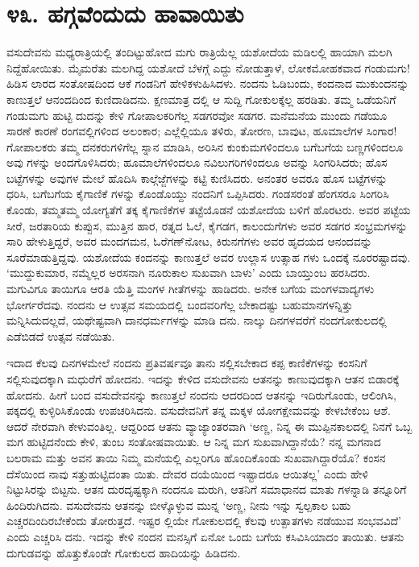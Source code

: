 
\chapter{೪೩. ಹಗ್ಗವೆಂದುದು ಹಾವಾಯಿತು}

ವಸುದೇವನು ಮಧ್ಯರಾತ್ರಿಯಲ್ಲಿ ತಂದಿಟ್ಟುಹೋದ ಮಗು ರಾತ್ರಿಯೆಲ್ಲ ಯಶೋದೆಯ ಮಡಿಲಲ್ಲಿ ಹಾಯಾಗಿ ಮಲಗಿ ನಿದ್ದೆಹೋಯಿತು. ಮೈಮರೆತು ಮಲಗಿದ್ದ ಯಶೋದೆ ಬೆಳಗ್ಗೆ ಎದ್ದು ನೋಡುತ್ತಾಳೆ, ಲೋಕಮೋಹಕವಾದ ಗಂಡುಮಗು! ಹಿಡಿಸ ಲಾರದ ಸಂತೋಷದಿಂದ ಆಕೆ ಗಂಡನಿಗೆ ಹೇಳಿಕಳುಹಿಸಿದಳು. ನಂದನು ಓಡಿಬಂದು, ಕಂದನಾದ ಮುಕುಂದನನ್ನು ಕಾಣುತ್ತಲೆ ಆನಂದದಿಂದ ಕುಣಿದಾಡಿದನು. ಕ್ಷಣಮಾತ್ರ ದಲ್ಲಿ ಆ ಸುದ್ದಿ ಗೋಕುಲಕ್ಕೆಲ್ಲ ಹರಡಿತು. ತಮ್ಮ ಒಡೆಯನಿಗೆ ಗಂಡುಮಗು ಹುಟ್ಟಿ ದುದನ್ನು ಕೇಳಿ ಗೋಪಾಲಕರಿಗೆಲ್ಲ ಸಡಗರವೋ ಸಡಗರ. ಮನೆಮನೆಯ ಮುಂದು ಗಡೆಯೂ ಸಾರಣೆ ಕಾರಣೆ ರಂಗವಲ್ಲಿಗಳಿಂದ ಅಲಂಕಾರ; ಎಲ್ಲೆಲ್ಲಿಯೂ ತಳಿರು, ತೋರಣ, ಬಾವುಟ, ಹೂಮಾಲೆಗಳ ಸಿಂಗಾರ! ಗೋಪಾಲಕರು ತಮ್ಮ ದನಕರುಗಳಿಗೆಲ್ಲ ಸ್ನಾನ ಮಾಡಿಸಿ, ಅರಿಸಿನ ಕುಂಕುಮಗಳಿಂದಲೂ ಬಗೆಬಗೆಯ ಬಣ್ಣಗಳಿಂದಲೂ ಅವು ಗಳನ್ನು ಅಂದಗೊಳಿಸಿದರು; ಹೂಮಾಲೆಗಳಿಂದಲೂ ನವಿಲುಗರಿಗಳಿಂದಲೂ ಅವನ್ನು ಸಿಂಗರಿಸಿದರು; ಹೊಸ ಬಟ್ಟೆಗಳನ್ನು ಅವುಗಳ ಮೇಲೆ ಹೊದಿಸಿ ಕಾಲ್ಗೆಜ್ಜೆಗಳನ್ನು ಕಟ್ಟಿ ಕುಣಿಸಿದರು. ಅನಂತರ ಅವರೂ ಹೊಸ ಬಟ್ಟೆಗಳನ್ನು ಧರಿಸಿ, ಬಗೆಬಗೆಯ ಕೈಗಾಣಿಕೆ ಗಳನ್ನು ಕೊಂಡೊಯ್ದು ನಂದನಿಗೆ ಒಪ್ಪಿಸಿದರು. ಗಂಡಸರಂತೆ ಹೆಂಗಸರೂ ಸಿಂಗರಿಸಿ ಕೊಂಡು, ತಮ್ಮತಮ್ಮ ಯೋಗ್ಯತೆಗೆ ತಕ್ಕ ಕೈಗಾಣಿಕೆಗಳ ತಟ್ಟೆಯೊಡನೆ ಯಶೋದೆಯ ಬಳಿಗೆ ಹೊರಟರು. ಅವರ ಪಟ್ಟೆಯ ಸೀರೆ, ಜರತಾರಿಯ ಕುಪ್ಪುಸ, ಮುತ್ತಿನ ಹಾರ, ರತ್ನದ ಓಲೆ, ಕೈಗಡಗ, ಕಾಲಂದುಗೆಗಳು ಅವರ ಸಡಗರ ಸಂಭ್ರಮಗಳನ್ನು ಸಾರಿ ಹೇಳುತ್ತಿದ್ದರೆ, ಅವರ ಮಂದಗಮನ, ಓರೆಗಣ್​ನೋಟ, ಕಿರುನಗೆಗಳು ಅವರ ಹೃದಯದ ಆನಂದವನ್ನು ಸೂರೆಮಾಡುತ್ತಿದ್ದವು. ಯಶೋದೆಯ ಕಂದನನ್ನು ಕಾಣುತ್ತಲೆ ಅವರ ಉಲ್ಲಾಸ ಉತ್ಸಾಹ ಗಳು ಒಂದಕ್ಕೆ ನೂರರಷ್ಟಾದವು. ‘ಮುದ್ದುಕುಮಾರ, ನಮ್ಮೆಲ್ಲರ ಅರಸನಾಗಿ ನೂರುಕಾಲ ಸುಖವಾಗಿ ಬಾಳು’ ಎಂದು ಬಾಯ್ತುಂಬ ಹರಸಿದರು. ಮಗುವಿಗೂ ತಾಯಿಗೂ ಆರತಿ ಯೆತ್ತಿ ಮಂಗಳ ಗೀತೆಗಳನ್ನು ಹಾಡಿದರು. ಅನೇಕ ಬಗೆಯ ಮಂಗಳವಾದ್ಯಗಳು ಭೋರ್ಗರೆದವು. ನಂದನು ಆ ಉತ್ಸವ ಸಮಯದಲ್ಲಿ ಬಂದವರಿಗೆಲ್ಲ ಬೇಕಾದಷ್ಟು ಬಹುಮಾನಗಳನ್ನಿತ್ತು ಮನ್ನಿಸಿದುದಲ್ಲದೆ, ಯಥೇಷ್ಟವಾಗಿ ದಾನಧರ್ಮಗಳನ್ನು ಮಾಡಿ ದನು. ನಾಲ್ಕು ದಿನಗಳವರೆಗೆ ನಂದಗೋಕುಲದಲ್ಲಿ ಎಡೆಬಿಡದೆ ಉತ್ಸವ ನಡೆಯಿತು.

ಇದಾದ ಕೆಲವು ದಿನಗಳಮೇಲೆ ನಂದನು ಪ್ರತಿವರ್ಷವೂ ತಾನು ಸಲ್ಲಿಸಬೇಕಾದ ಕಪ್ಪ ಕಾಣಿಕೆಗಳನ್ನು ಕಂಸನಿಗೆ ಸಲ್ಲಿಸುವುದಕ್ಕಾಗಿ ಮಧುರೆಗೆ ಹೋದನು. ಇದನ್ನು ಕೇಳಿದ ವಸುದೇವನು ಆತನನ್ನು ಕಾಣುವುದಕ್ಕಾಗಿ ಆತನ ಬಿಡಾರಕ್ಕೆ ಹೋದನು. ಹೀಗೆ ಬಂದ ವಸುದೇವನನ್ನು ಕಾಣುತ್ತಲೆ ನಂದನು ಆದರದಿಂದ ಆತನನ್ನು ಇದಿರುಗೊಂಡು, ಆಲಿಂಗಿಸಿ, ಪಕ್ಕದಲ್ಲಿ ಕುಳ್ಳಿರಿಸಿಕೊಂಡು ಉಪಚರಿಸಿದನು. ವಸುದೇವನಿಗೆ ತನ್ನ ಮಕ್ಕಳ ಯೋಗಕ್ಷೇಮವನ್ನು ಕೇಳಬೇಕೆಂಬ ಆಶೆ. ಆದರೆ ನೇರವಾಗಿ ಕೇಳುವಂತಿಲ್ಲ. ಆದ್ದರಿಂದ ಆತನು ವ್ಯಾಜ್ಯಾಂತರವಾಗಿ ‘ಅಣ್ಣ, ನಿನ್ನ ಈ ಮುಪ್ಪಿನಕಾಲದಲ್ಲಿ ನಿನಗೆ ಒಬ್ಬ ಮಗ ಹುಟ್ಟಿದನೆಂದು ಕೇಳಿ, ತುಂಬ ಸಂತೋಷವಾಯಿತು. ಆ ನಿನ್ನ ಮಗ ಸುಖವಾಗಿದ್ದಾನೆಯೆ? ನನ್ನ ಮಗನಾದ ಬಲರಾಮ ಮತ್ತು ಅವನ ತಾಯಿ ನಿಮ್ಮ ಮನೆಯಲ್ಲಿ ಎಲ್ಲರಿಗೂ ಹೊಂದಿಕೊಂಡು ಸುಖವಾಗಿದ್ದಾರೆಯೊ? ಕಂಸನ ದೆಸೆಯಿಂದ ನಾವು ಸತ್ತುಹುಟ್ಟಿದಂತಾ ಯಿತು. ದೇವರ ದಯೆಯಿಂದ ಇಷ್ಟಾದರೂ ಆಯಿತಲ್ಲ’ ಎಂದು ಹೇಳಿ ನಿಟ್ಟುಸಿರನ್ನು ಬಿಟ್ಟನು. ಆತನ ದುರದೃಷ್ಟಕ್ಕಾಗಿ ನಂದನೂ ಮರುಗಿ, ಆತನಿಗೆ ಸಮಾಧಾನದ ಮಾತು ಗಳನ್ನಾಡಿ ತನ್ನೂರಿಗೆ ಹಿಂದಿರುಗಿದನು. ವಸುದೇವನು ಆತನನ್ನು ಬೀಳ್ಕೊಳ್ಳುವ ಮುನ್ನ ‘ಅಣ್ಣ, ನೀನು ಇನ್ನು ಸ್ವಲ್ಪಕಾಲ ಬಹು ಎಚ್ಚರದಿಂದಿರಬೇಕೆಂದು ತೋರುತ್ತದೆ. ಇಷ್ಟರ ಲ್ಲಿಯೇ ಗೋಕುಲದಲ್ಲಿ ಕೆಲವು ಉತ್ಪಾತಗಳು ನಡೆಯುವ ಸಂಭವವಿದೆ’ ಎಂದು ಎಚ್ಚರಿಸಿ ದನು. ಇದನ್ನು ಕೇಳಿ ನಂದನ ಮನಸ್ಸಿಗೆ ಏನೋ ಒಂದು ಬಗೆಯ ಕಸಿವಿಸಿಯಾದಂ ತಾಯಿತು. ಆತನು ದುಗುಡವನ್ನು ಹೊತ್ತುಕೊಂಡೇ ಗೋಕುಲದ ಹಾದಿಯನ್ನು ಹಿಡಿದನು.

